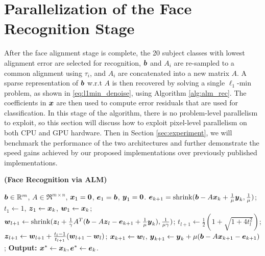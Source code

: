 \documentclass[preprint]{sigplanconf}
\begin{document}
\section{Parallelization of the Face Recognition Stage} \vspace{-0.06in}
\label{sec:recognition}
After the face alignment stage is complete, the 20 subject classes with lowest
alignment error are selected for recognition, ${\boldsymbol{b}}$ and $A_i$ are re-sampled to a common alignment
using $\tau_i$, and $A_i$ are concatenated into a new matrix $A$.
A sparse representation of ${\boldsymbol{b}}$ w.r.t $A$ is then recovered
by solving a single $\ell_1$-min problem, as shown
in \eqref{eq:l1min_denoise}, using Algorithm \ref{alg:alm_rec}.  The
coefficients in ${\boldsymbol{x}}$ are then used to compute error residuals that are used for
classification.  
In this stage of the algorithm, there is no problem-level
parallelism to exploit, so this section will discuss how to exploit pixel-level parallelism
on both CPU and GPU hardware.
Then in Section \ref{sec:experiment}, we will benchmark the
performance of the two architectures and further demonstrate the speed
gains achieved by our proposed implementations over previously published implementations.

\begin{algorithm}[t]
\caption{\bf (Face Recognition via ALM)} \label{alg:alm_rec} 
\begin{algorithmic}[1]
\begin{small}
 ${\boldsymbol{b}} \in {\mathbb{R}}^m$, $A \in \Re^{m \times n}$,
${\boldsymbol{x}}_1 = \boldsymbol{0}$, $\boldsymbol{e}_1 = {\boldsymbol{b}}$, $\boldsymbol{y}_1 =
\boldsymbol{0}$.
\STATE $\boldsymbol{e}_{k+1} = {\text{shrink}}({\boldsymbol{b}} - A{\boldsymbol{x}}_k +
\frac{1}{\mu}\boldsymbol{y}_k, \frac{1}{\mu})$;
\STATE $t_1\leftarrow 1$, $\boldsymbol{z}_1 \leftarrow {\boldsymbol{x}}_k$, $\boldsymbol{w}_1 \leftarrow {\boldsymbol{x}}_k$;
\STATE $\boldsymbol{w}_{l+1} \leftarrow {\text{shrink}}(\boldsymbol{z}_l +
\frac{1}{\gamma}A^T({\boldsymbol{b}} - A\boldsymbol{z}_l - \boldsymbol{e}_{k+1} +
\frac{1}{\mu}\boldsymbol{y}_k), \frac{1}{\mu\gamma})$;
\STATE $t_{l+1} \leftarrow \frac{1}{2}( 1 +
\sqrt{1+4t_l^2})$;
\STATE $\boldsymbol{z}_{l+1} \leftarrow \boldsymbol{w}_{l+1} + \frac{t_l - 1}{t_{l+1}}(\boldsymbol{w}_{l+1} - \boldsymbol{w}_l)$;
\ENDWHILE
\STATE ${\boldsymbol{x}}_{k+1} \leftarrow \boldsymbol{w}_{l}$,  \; $\boldsymbol{y}_{k+1} \leftarrow \boldsymbol{y}_k + \mu ({\boldsymbol{b}} - A{\boldsymbol{x}}_{k+1} - \boldsymbol{e}_{k+1})$;
\ENDWHILE \STATE
{\bf Output:} ${\boldsymbol{x}}^* \leftarrow {\boldsymbol{x}}_k, \boldsymbol{e}^* \leftarrow \boldsymbol{e}_k$.
\end{small}
\end{algorithmic}
\end{algorithm}
\end{document}
